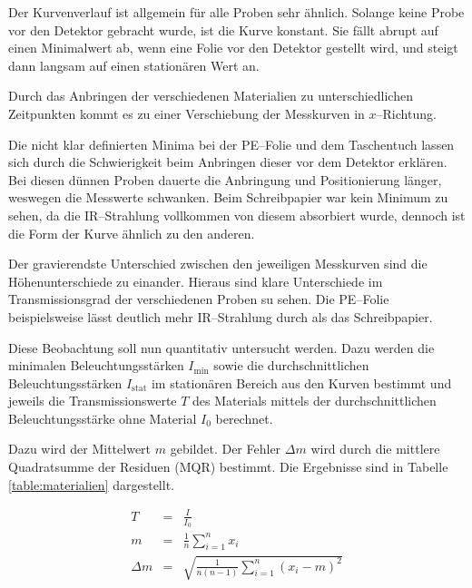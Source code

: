 \documentclass[12pt,a4paper]{scrartcl}
\numberwithin{equation}{section} %
\begin{document}
Der Kurvenverlauf ist allgemein für alle Proben sehr ähnlich. Solange keine Probe vor den Detektor gebracht wurde, ist die Kurve konstant. Sie fällt abrupt auf einen Minimalwert ab, wenn eine Folie vor den Detektor gestellt wird, und steigt dann langsam auf einen stationären Wert an.

Durch das Anbringen der verschiedenen Materialien zu unterschiedlichen Zeitpunkten kommt es zu einer Verschiebung der Messkurven in $x$--Richtung.

Die nicht klar definierten Minima bei der PE--Folie und dem Taschentuch lassen sich durch die Schwierigkeit beim Anbringen dieser vor dem Detektor erklären. Bei diesen dünnen Proben dauerte die Anbringung und Positionierung länger, weswegen die Messwerte schwanken. Beim Schreibpapier war kein Minimum zu sehen, da die IR--Strahlung vollkommen von diesem absorbiert wurde, dennoch ist die Form der Kurve ähnlich zu den anderen.

Der gravierendste Unterschied zwischen den jeweiligen Messkurven sind die Höhenunterschiede zu einander. Hieraus sind klare Unterschiede im Transmissionsgrad der verschiedenen Proben su sehen. Die PE--Folie beispielsweise lässt deutlich mehr IR--Strahlung durch als das Schreibpapier.

Diese Beobachtung soll nun quantitativ untersucht werden. Dazu werden die minimalen Beleuchtungsstärken $I_\mathrm{min}$ sowie die durchschnittlichen Beleuchtungsstärken $I_\mathrm{stat}$ im stationären Bereich aus den Kurven bestimmt und jeweils die Transmissionswerte $T$ des Materials mittels der durchschnittlichen Beleuchtungsstärke ohne Material $I_0$ berechnet.

Dazu wird der Mittelwert $m$ gebildet. Der Fehler $\Delta m$ wird durch die mittlere Quadratsumme der Residuen (MQR) bestimmt. Die Ergebnisse sind in Tabelle \ref{table:materialien} dargestellt.

\begin{eqnarray}
  T &=& \frac{I}{I_0} \\
  m &=& \frac{1}{n} \sum_{i=1}^{n} x_i \\
  \Delta m &=& \sqrt{\frac{1}{n (n-1)} \sum_{i=1}^{n} (x_i - m)^2}
\end{eqnarray}
\end{document}
